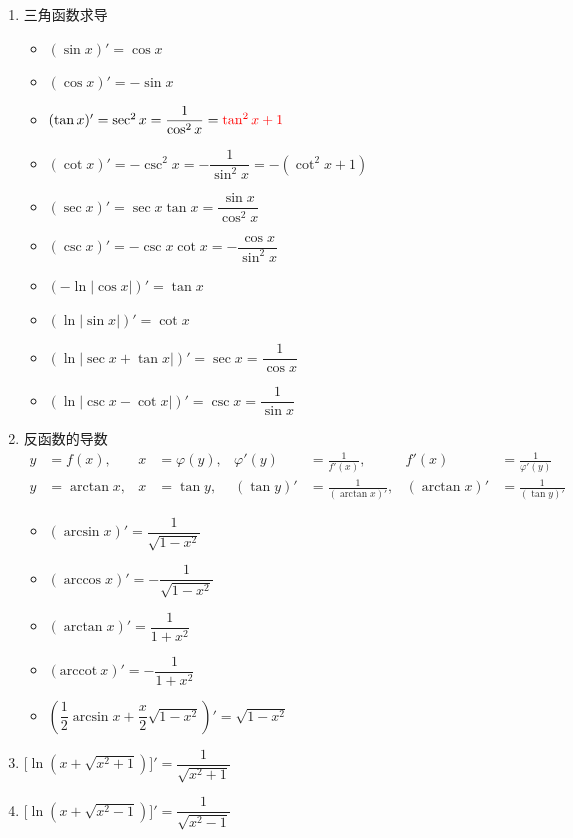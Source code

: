 \documentclass[../book.tex]{subfiles}
\begin{document}
\begin{enumerate}
        \item 三角函数求导
        \begin{itemize}
            \item $(\sin x)' = \cos x$
            \item $(\cos x)' = -\sin x$
            \item $(\tan x)' = \sec^2 x = \dfrac{1}{\cos^2 x} = {\color{red}{\tan^2 x + 1}}$
            \item $(\cot x)' = -\csc^2 x = -\dfrac{1}{\sin^2 x} = -(\cot^2 x + 1)$
            \item $(\sec x)' = \sec x \tan x = \dfrac{\sin x}{\cos^2 x}$
            \item $(\csc x)' = -\csc x \cot x = -\dfrac{\cos x}{\sin^2 x}$
            \item $(-\ln|\cos x|)' = \tan x$
            \item $(\ln|\sin x|)' = \cot x$
            \item $(\ln|\sec x + \tan x|)' = \sec x = \dfrac{1}{\cos x}$
            \item $(\ln|\csc x - \cot x|)' = \csc x = \dfrac{1}{\sin x}$
        \end{itemize}
        \item 反函数的导数
        \[
            \begin{aligned}
                y & = f(x),        & x & = \varphi(y),        & \varphi'(y) & = \frac{1}{f'(x)},        & f'(x) & = \frac{1}{\varphi'(y)} \\[4pt]
                y & = \arctan x,   & x & = \tan y,            & (\tan y)'   & = \frac{1}{(\arctan x)'}, & (\arctan x)' & = \frac{1}{(\tan y)'}
            \end{aligned}
        \]
        \begin{itemize}
            \item $(\arcsin x)' = \dfrac{1}{\sqrt{1-x^2}}$
            \item $(\arccos x)' = -\dfrac{1}{\sqrt{1-x^2}}$
            \item $(\arctan x)' = \dfrac{1}{1+x^2}$
            \item $(\mathrm{arccot}\ x)' = -\dfrac{1}{1+x^2}$
            \item $(\dfrac{1}{2}\arcsin x + \dfrac{x}{2}\sqrt{1 - x^2})' = \sqrt{1 - x^2}$
        \end{itemize}

        \item $\bigl[\ln (x+\sqrt{x^2+1})\bigr]'
        = \dfrac{1}{\sqrt{x^2+1}}$

        \item $\bigl[\ln (x+\sqrt{x^2-1})\bigr]'
        = \dfrac{1}{\sqrt{x^2-1}}$
    \end{enumerate}
\end{document}
